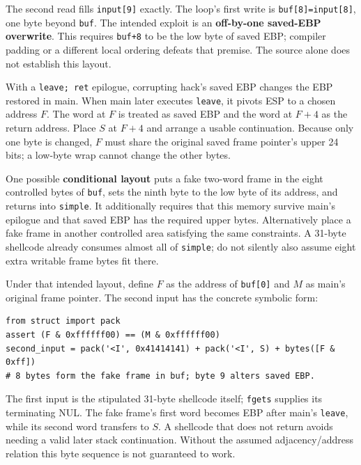 \documentclass[11pt,a4paper]{article}
\begin{document}
The second read fills \texttt{input[9]} exactly. The loop's first write is \texttt{buf[8]=\allowbreak{}input[8]},\allowbreak{} one byte beyond \texttt{buf}. The intended exploit is an \textbf{off-by-one saved-EBP overwrite}. This requires \texttt{buf+8} to be the low byte of saved EBP; compiler padding or a different local ordering defeats that premise. The source alone does not establish this layout.


With a \texttt{leave; ret} epilogue,\allowbreak{} corrupting hack's saved EBP changes the EBP restored in main. When main later executes \texttt{leave},\allowbreak{} it pivots ESP to a chosen address \(F\). The word at \(F\) is treated as saved EBP and the word at \(F+4\) as the return address. Place \(S\) at \(F+4\) and arrange a usable continuation. Because only one byte is changed,\allowbreak{} \(F\) must share the original saved frame pointer's upper 24 bits; a low-byte wrap cannot change the other bytes.


One possible \textbf{conditional layout} puts a fake two-word frame in the eight controlled bytes of \texttt{buf},\allowbreak{} sets the ninth byte to the low byte of its address,\allowbreak{} and returns into \texttt{simple}. It additionally requires that this memory survive main's epilogue and that saved EBP has the required upper bytes. Alternatively place a fake frame in another controlled area satisfying the same constraints. A 31-byte shellcode already consumes almost all of \texttt{simple}; do not silently also assume eight extra writable frame bytes fit there.


Under that intended layout,\allowbreak{} define \(F\) as the address of \texttt{buf[0]} and \(M\) as main's original frame pointer. The second input has the concrete symbolic form:



\begin{Verbatim}[breaklines=true,breakanywhere=true,fontsize=\small,frame=single,rulecolor=\color{PanelBorder}]
from struct import pack
assert (F & 0xffffff00) == (M & 0xffffff00)
second_input = pack('<I', 0x41414141) + pack('<I', S) + bytes([F & 0xff])
# 8 bytes form the fake frame in buf; byte 9 alters saved EBP.
\end{Verbatim}

The first input is the stipulated 31-byte shellcode itself; \texttt{fgets} supplies its terminating NUL. The fake frame's first word becomes EBP after main's \texttt{leave},\allowbreak{} while its second word transfers to \(S\). A shellcode that does not return avoids needing a valid later stack continuation. Without the assumed adjacency/\allowbreak{}address relation this byte sequence is not guaranteed to work.
\end{document}

